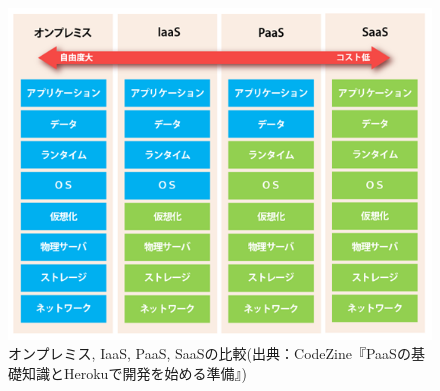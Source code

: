 \begin{figure}
\begin{center}
\includegraphics[width=16cm]{fig/paas.png}
\caption{オンプレミス, IaaS, PaaS, SaaSの比較(出典：CodeZine『PaaSの基礎知識とHerokuで開発を始める準備』)}
\end{center}
\end{figure}

